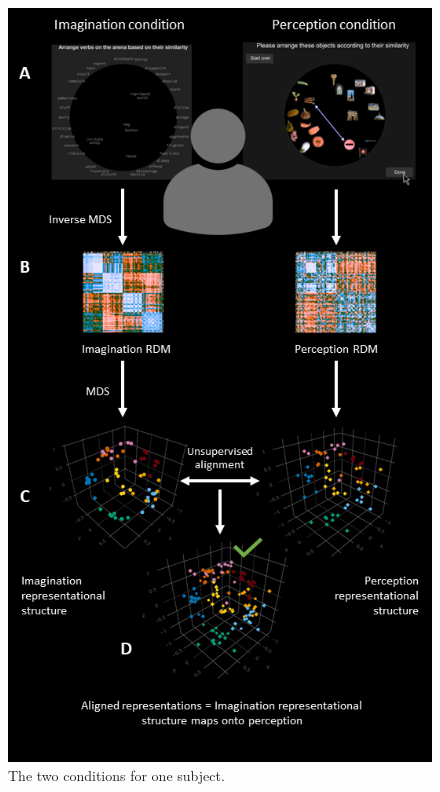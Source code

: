 \documentclass[
  authoryear]{elsarticle}
\begin{document}
\begin{figure}[H]

{\centering \includegraphics{images/my-protocol-1.png}

}

\caption{The two conditions for one subject.}

\end{figure}%
\end{document}
